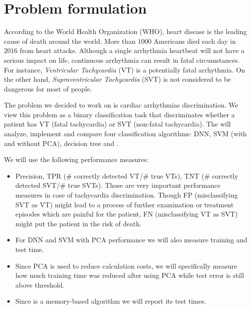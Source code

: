 \section{Problem  formulation}
\label{sec:problem}

According to the World Health Organization (WHO), heart disease is 
the leading cause of death around the world.
More than $1000$ Americans died each day in $2016$ from heart 
attacks. 
Although a single arrhythmia heartbeat will not have a serious impact 
on life, continuous arrhythmia can result in fatal circumstances.
For instance, \textit{Ventricular Tachycardia} (VT) is a potentially 
fatal arrhythmia. 
On the other hand, \textit{Supraventricular Tachycardia} (SVT)
is not considered to be dangerous for most of people. 

The problem we decided to work on is cardiac arrhythmias 
discrimination. We view this problem as a binary classification task 
that discriminates whether a patient has VT (fatal tachycardia) or  
SVT (non-fatal tachycardia). The will analyze, implement and compare 
four classification algorithms: DNN, SVM (with and without 
PCA), 
decision tree and \knn.



We will use the following performance measures:
\begin{itemize}
	\item Precision, 
	TPR ($\#$ correctly detected VT/$\#$ true VTs), 
	TNT ($\#$ correctly detected SVT/$\#$ true SVTs). 
	Those are very important performance measures in case of 
	tachycardia discrimination. Though FP (misclassifying SVT as VT) 
	might lead 	to a 	process of further examination or treatment 
	episodes which are 
	painful for the patient, FN (misclassifying VT as SVT) might put 
	the patient in the risk of death.  
	\item For DNN and SVM with PCA performance we will also measure 
	training 
	and test time.
	\item Since PCA is used to reduce calculation costs, we will 
	specifically 
	measure how much training time was reduced after using PCA while 
	test error is still above threshold. 
	\item Since \knn{} is a memory-based algorithm we will report its 
	test times. 
\end{itemize}


